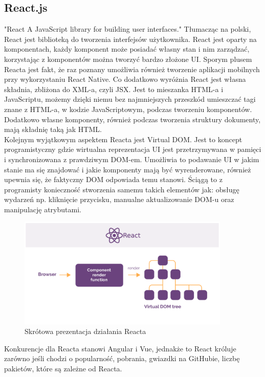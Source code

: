 \documentclass[12pt]{article}
\begin{document}
\begin{sloppypar}
{  \subsection{React.js}
  {
    "React A JavaScript library for building user interfaces."\cite{react} Tłumacząc na polski, React jest biblioteką do tworzenia interfejsów użytkownika. 
    React jest oparty na komponentach, każdy komponent może posiadać własny stan i nim zarządzać, korzystając z komponentów można tworzyć bardzo złożone UI. 
    Sporym plusem Reacta jest fakt, że raz poznany umożliwia również tworzenie aplikacji mobilnych przy wykorzystaniu React Native. Co dodatkowo wyróżnia React 
    jest własna składnia, zbliżona do XML-a, czyli JSX. Jest to mieszanka HTML-a i JavaScriptu, możemy dzięki niemu bez najmniejszych przeszkód umieszczać 
    tagi znane z HTML-a, w kodzie JavaScriptowym, podczas tworzeniu komponentów. Dodatkowo własne komponenty, również podczas tworzenia struktury dokumenty, mają 
    składnię taką jak HTML. \\
    Kolejnym wyjątkowym aspektem Reacta jest Virtual DOM. Jest to koncept programistyczny gdzie wirtualna reprezentacja UI jest 
    przetrzymywana w pamięci i synchronizowana z prawdziwym DOM-em. 
    Umożliwia to podawanie UI w jakim stanie ma się znajdować i jakie komponenty mają być wyrenderowane, również upewnia się, że faktyczny DOM odpowiada temu stanowi. 
    Ściągą to z programisty konieczność stworzenia samemu takich elementów jak: obsługę wydarzeń np. kliknięcie przycisku, manualne aktualizowanie DOM-u oraz manipulację atrybutami.
    \begin{figure}[H]
      \centering
      \includegraphics[width=0.9\textwidth]{how_react_works.PNG}
      \caption{Skrótowa prezentacja działania Reacta}
      \label{fig:how-react-works}
    \end{figure}
    Konkurencje dla Reacta stanowi Angular i Vue, jednakże to React króluje zarówno jeśli chodzi o popularność, pobrania, gwiazdki na GitHubie, liczbę pakietów, które są zależne od Reacta. 
}}
\end{sloppypar}
\end{document}
